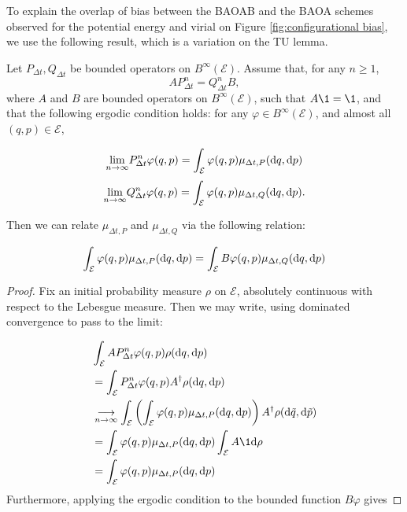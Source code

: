 To explain the overlap of bias between the BAOAB and the BAOA schemes observed for the potential energy and virial on Figure \ref{fig:configurational bias}, we use the following result, which is a variation on the TU lemma.
\begin{lemma}\label{TU_like_lemma}
    Let $P_{\Delta t}, Q_{\Delta t}$ be bounded operators on $B^\infty(\mathcal E)$.
    Assume that, for any $n\geq 1$,
    $$ A P_{\Delta t}^n = Q_{\Delta t}^n B,$$
    where $A$ and $B$ are bounded operators on $B^\infty (\mathcal E)$, such that $A\1=\1$, and that the following ergodic condition holds: for any $\varphi \in B^\infty(\mathcal E)$, and almost all $(q,p) \in \mathcal E$,

    $$ \underset{n\to\infty}\lim P_{\Delta t}^n\varphi (q,p) = \int_{\mathcal E} \varphi(q,p)\mu_{\Delta t,P}(\text d q,\text d p) $$
    $$ \underset{n\to\infty}\lim Q_{\Delta t}^n\varphi (q,p) = \int_{\mathcal E} \varphi(q,p)\mu_{\Delta t,Q}(\text d q,\text d p).$$

    Then  we can relate $\mu_{\Delta t,P}$ and $\mu_{\Delta t,Q}$ via the following relation:

    \begin{equation}
        \label{TU_like_lemma_ccl}
    \int_{\mathcal E} \varphi(q,p) \mu_{\Delta t,P}(\text d q,\text d p)=\int_{\mathcal E} B\varphi(q,p) \mu_{\Delta t,Q}(\text d q,\text d p)
    \end{equation}
    \begin{proof}
        Fix an initial probability measure $\rho$ on $\mathcal E$, absolutely continuous with respect to the Lebesgue measure. Then we may write, using dominated convergence to pass to the limit:

        \begin{align*}
            &\int_{\mathcal E}AP_{\Delta t}^n \varphi(q,p)\rho(\text d q,\text d p)\\
            &=\int_{\mathcal E}P_{\Delta t}^n \varphi(q,p)A^{\dagger}\rho(\text d q,\text d p)\\
            &\underset{n\to\infty}{\longrightarrow}\int_{\mathcal E} \left (\int_{\mathcal E}\varphi(q,p)\mu_{\Delta t,P}(\text d q,\text d p)\right) A^\dagger \rho(\text d \tilde q,\text d \tilde p)\\
            &=\int_{\mathcal E}\varphi(q,p)\mu_{\Delta t,P}(\text d q,\text d p)\int_{\mathcal E}A\1 \text d \rho\\
            &=\int_{\mathcal E}\varphi(q,p)\mu_{\Delta t,P}(\text d q,\text d p)
        \end{align*}
        Furthermore, applying the ergodic condition to the bounded function $B\varphi$ gives


\end{proof}
\end{lemma}
